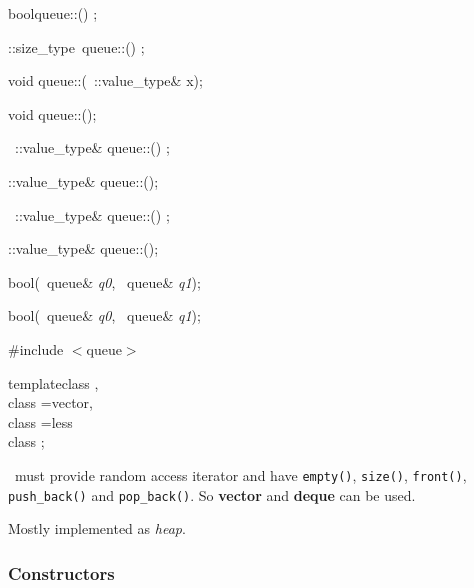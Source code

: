 \begin{multicols}{4}
bool\enskip queue::() \const;

\Container::size_type\ queue::() \const;

void \newline
queue::(\const\  \Container::value_type\& x);

void queue::();

\const\ \Container::value_type\&\newline
queue::() \const;

\Container::value_type\& queue::();

\const\ \Container::value_type\&\newline
queue::() \const;

\Container::value_type\& queue::();

{}

bool\enskip \opereq(\const\  queue\& \textsl{q0},
\phantom{bool\enskip \opereq\lp}\const\  queue\& \textsl{q1});

bool\enskip \operlt(\const\  queue\& \textsl{q0},
\phantom{bool\enskip \operlt\lp}\const\  queue\& \textsl{q1});


\#include $<$queue$>$\newline

\begin{templdec}
template\<class \T,\\
\phantom{template$<$}class \Container=vector\TPT,\\
\phantom{template$<$}class \Compare=less\TPT\ \>\\
class ;\\
\end{templdec}

\Container\ must
provide random access iterator and have
\texttt{empty()}, 
\texttt{size()}, 
\texttt{front()}, 
\texttt{push_back()} and
\texttt{pop_back()}.
So 
\textbf{vector} and
\textbf{deque}
can be used.

Mostly implemented as \emph{heap}.

\subsubsection{Constructors}


\end{multicols}
